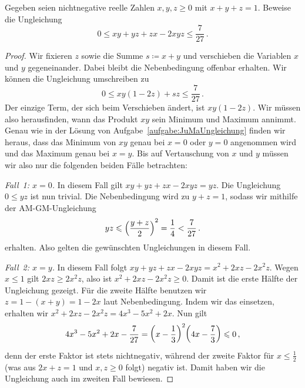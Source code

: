 \begin{aufgabe*}
	Gegeben seien nichtnegative reelle Zahlen $x,y,z\geqslant 0$ mit $x+y+z=1$. Beweise die Ungleichung
	\begin{equation*}
		0\leqslant xy+yz+zx-2xyz\leqslant\frac{7}{27}\,.
	\end{equation*}
\end{aufgabe*}
\begin{proof}
	Wir fixieren $z$ sowie die Summe $s\coloneqq x+y$ und verschieben die Variablen $x$ und $y$ gegeneinander. Dabei bleibt die Nebenbedingung offenbar erhalten. Wir können die Ungleichung umschreiben zu
	\begin{equation*}
		0\leqslant xy(1-2z)+sz\leqslant \frac{7}{27}\,.
	\end{equation*}
	Der einzige Term, der sich beim Verschieben ändert, ist $xy(1-2z)$. Wir müssen also herausfinden, wann das Produkt $xy$ sein Minimum und Maximum annimmt. Genau wie in der Lösung von Aufgabe~\ref{aufgabe:JuMaUngleichung} finden wir heraus, dass das Minimum von $xy$ genau bei $x=0$ oder $y=0$ angenommen wird und das Maximum genau bei $x=y$. Bis auf Vertauschung von $x$ und $y$ müssen wir also nur die folgenden beiden Fälle betrachten:
	
	\emph{Fall~1: $x=0$.} In diesem Fall gilt $xy+yz+zx-2xyz=yz$. Die Ungleichung $0\leqslant yz$ ist nun trivial. Die Nebenbedingung wird zu $y+z=1$, sodass wir mithilfe der AM-GM-Ungleichung
	\begin{equation*}
		yz\leqslant\parens*{\frac{y+z}{2}}^2=\frac{1}{4}<\frac{7}{27}\,.
	\end{equation*}
	erhalten. Also gelten die gewünschten Ungleichungen in diesem Fall.
	
	\emph{Fall~2: $x=y$.} In diesem Fall folgt $xy+yz+zx-2xyz=x^2+2xz-2x^2z$. Wegen $x\leqslant 1$ gilt $2xz\geqslant 2x^2z$, also ist $x^2+2xz-2x^2z\geqslant 0$. Damit ist die erste Hälfte der Ungleichung gezeigt. Für die zweite Hälfte benutzen wir $z=1-(x+y)=1-2x$ laut Nebenbedingung. Indem wir das einsetzen, erhalten wir $x^2+2xz-2x^2z=4x^3-5x^2+2x$. Nun gilt
	\begin{equation*}
		4x^3-5x^2+2x-\frac{7}{27}=\parens*{x-\frac13}^2\parens*{4x-\frac{7}{3}}\leqslant 0\,,
	\end{equation*}
	denn der erste Faktor ist stets nichtnegativ, während der zweite Faktor für $x\leqslant \frac12$ (was aus $2x+z=1$ und $x,z\geqslant 0$ folgt) negativ ist. Damit haben wir die Ungleichung auch im zweiten Fall bewiesen.
\end{proof}

